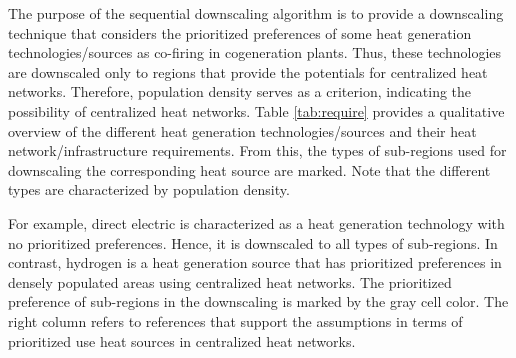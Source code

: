 The purpose of the sequential downscaling algorithm is to provide a downscaling technique that considers the prioritized preferences of some heat generation technologies/sources as co-firing in cogeneration plants. Thus, these technologies are downscaled only to regions that provide the potentials for centralized heat networks. Therefore, population density serves as a criterion, indicating the possibility of centralized heat networks. Table \ref{tab:require} provides a qualitative overview of the different heat generation technologies/sources and their heat network/infrastructure requirements. From this, the types of sub-regions used for downscaling the corresponding heat source are marked. Note that the different types are characterized by population density.
\vspace{0.3cm}
\begin{table}[h]
	\centering
	\setlength{\extrarowheight}{.5em}
	\caption{Qualitative overview for heat generation technologies/sources and their requirments for heat network infrastructure. The prioritized preferences (gray cell color) of heat sources in sub-regions is marked by the gray color.}
	\label{tab:require}
\end{table}

For example, direct electric is characterized as a heat generation technology with no prioritized preferences. Hence, it is downscaled to all types of sub-regions. In contrast, hydrogen is a heat generation source that has prioritized preferences in densely populated areas using centralized heat networks. The prioritized preference of sub-regions in the downscaling is marked by the gray cell color. The right column refers to references that support the assumptions in terms of prioritized use heat sources in centralized heat networks.\newline

